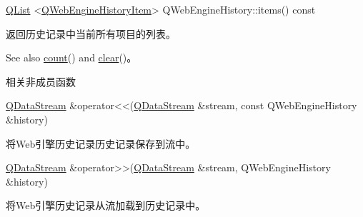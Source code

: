 \href{https://github.com/QtDocumentCN/QtDocumentCN/blob/master/Src/L/QList/QList.md}{QList} <\href{https://github.com/QtDocumentCN/QtDocumentCN/blob/master/Src/W/QWebEngineHistoryItem/QWebEngineHistoryItem.md}{QWebEngineHistoryItem}> QWebEngineHistory::items() const

返回历史记录中当前所有项目的列表。

See also \href{https://doc.qt.io/qt-5/qwebenginehistory.html#count}{count}() and \href{https://doc.qt.io/qt-5/qwebenginehistory.html#clear}{clear}()。

相关非成员函数

\href{https://github.com/QtDocumentCN/QtDocumentCN/blob/master/Src/D/QDataStream/QDataStream.md}{QDataStream}  \&operator<<(\href{https://github.com/QtDocumentCN/QtDocumentCN/blob/master/Src/D/QDataStream/QDataStream.md}{QDataStream} \&stream, const QWebEngineHistory \&history)


将Web引擎历史记录历史记录保存到流中。

\href{https://github.com/QtDocumentCN/QtDocumentCN/blob/master/Src/D/QDataStream/QDataStream.md}{QDataStream} \&operator>>(\href{https://github.com/QtDocumentCN/QtDocumentCN/blob/master/Src/D/QDataStream/QDataStream.md}{QDataStream} \&stream, QWebEngineHistory \&history)


将Web引擎历史记录从流加载到历史记录中。

